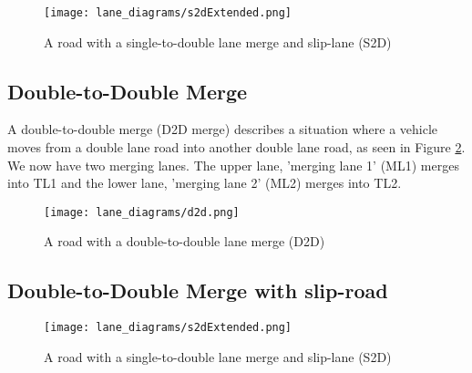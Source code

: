 \begin{figure}[htb]
\texttt{[image: lane\_diagrams/s2dExtended.png]}
\caption{A road with a single-to-double lane merge and slip-lane (S2D)}
\label{fig:S2DMergeExtended}
\end{figure}

\subsection{Double-to-Double Merge}
\label{subsec:Double-to-Double Merge}
A double-to-double merge (D2D merge) describes a situation where a vehicle moves from a double lane road into another double lane road, as seen in Figure \ref{fig:D2DMerge}. We now have two merging lanes. The upper lane, 'merging lane 1' (ML1) merges into TL1 and the lower lane, 'merging lane 2' (ML2) merges into TL2.

\begin{figure}[htb]
\texttt{[image: lane\_diagrams/d2d.png]}
\caption{A road with a double-to-double lane merge (D2D)}
\label{fig:D2DMerge}
\end{figure}


\subsection{Double-to-Double Merge with slip-road}
\label{subsec:Double-to-Double Merge with slip-road}


\begin{figure}[htb]
\texttt{[image: lane\_diagrams/s2dExtended.png]}
\caption{A road with a single-to-double lane merge and slip-lane (S2D)}
\label{fig:D2DMergeExtended}
\end{figure}


